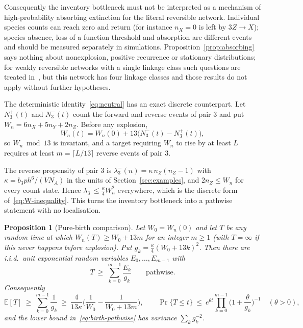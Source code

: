 \documentclass[11pt,a4paper]{article}
\theoremstyle{plain}
\newtheorem{proposition}[theorem]{Proposition}
\theoremstyle{definition}
\theoremstyle{remark}
\begin{document}
Consequently the inventory bottleneck must not be interpreted as a mechanism of high-probability absorbing extinction for the literal reversible network. Individual species counts can reach zero and return (for instance $n_X=0$ is left by $3Z\to X$); species absence, loss of a function threshold and absorption are different events and should be measured separately in simulations. Proposition~\ref{prop:absorbing} says nothing about nonexplosion, positive recurrence or stationary distributions; for weakly reversible networks with a single linkage class such questions are treated in~\cite{AndersonCappellettiKim2019}, but this network has four linkage classes and those results do not apply without further hypotheses.

The deterministic identity~\eqref{eq:neutral} has an exact discrete counterpart. Let $N_3^{+}(t)$ and $N_3^{-}(t)$ count the forward and reverse events of pair $3$ and put $W_n=6n_X+5n_Y+2n_Z$. Before any explosion,
\begin{equation}\label{eq:discrete-inventory}
 W_n(t)=W_n(0)+13\big(N_3^-(t)-N_3^+(t)\big),
\end{equation}
so $W_n\bmod13$ is invariant, and a target requiring $W_n$ to rise by at least $L$ requires at least $m=\lceil L/13\rceil$ reverse events of pair $3$.

The reverse propensity of pair $3$ is $\lambda_3^-(n)=\kappa\,n_Z(n_Z-1)$ with $\kappa=b_3ph^6/(VN_{\!A})$ in the units of Section~\ref{sec:examples}, and $2n_Z\le W_n$ for every count state. Hence $\lambda_3^-\le\tfrac{\kappa}{4}W_n^2$ everywhere, which is the discrete form of~\eqref{eq:W-inequality}. This turns the inventory bottleneck into a pathwise statement with no localisation.

\begin{proposition}[Pure-birth comparison]\label{prop:birth}
Let $W_0=W_n(0)$ and let $T$ be any random time at which $W_n(T)\ge W_0+13m$ for an integer $m\ge1$ (with $T=\infty$ if this never happens before explosion). Put $g_k=\tfrac{\kappa}{4}(W_0+13k)^2$. Then there are i.i.d.\ unit exponential random variables $E_0,\dots,E_{m-1}$ with
\begin{equation}\label{eq:birth-pathwise}
 T\ \ge\ \sum_{k=0}^{m-1}\frac{E_k}{g_k}\qquad\text{pathwise}.
\end{equation}
Consequently
\begin{equation}\label{eq:birth-moments}
 \mathbb E[T]\ \ge\ \sum_{k=0}^{m-1}\frac1{g_k}\ \ge\ \frac{4}{13\kappa}\Big(\frac1{W_0}-\frac1{W_0+13m}\Big),\qquad
 \Pr\{T\le t\}\ \le\ e^{\theta t}\prod_{k=0}^{m-1}\Big(1+\frac\theta{g_k}\Big)^{-1}\quad(\theta>0),
\end{equation}
and the lower bound in~\eqref{eq:birth-pathwise} has variance $\sum_kg_k^{-2}$.
\end{proposition}
\end{document}
